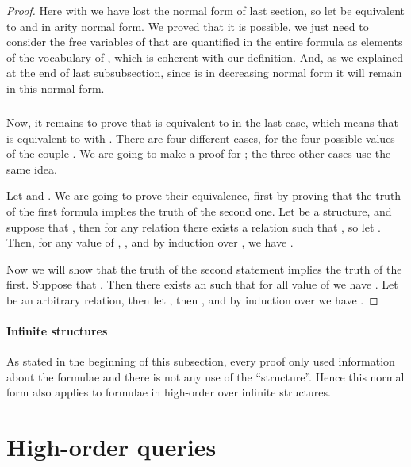 \documentclass[a4paper,12pt]{article}
\theoremstyle{definition}
\begin{document}
\begin{proof}
  Here with  we have lost the normal form of last
  section, so let  be equivalent to  and in arity
  normal form. We proved that it is possible, we just need to consider
  the free variables of  that are quantified in the entire
  formula as elements of the vocabulary of , which is coherent
  with our definition. And, as we explained at the end of last
  subsubsection, since  is in decreasing normal form it will
  remain in this normal form.

  \subparagraph{} Now, it remains to prove that  is equivalent
  to  in the last case, which means that  is equivalent to  with . There are four
  different cases, for the four possible values of the couple
  . We are going to make a proof for ;
  the three other cases use the same idea.

  Let  and
  . We are
  going to prove their equivalence, first by proving that the truth of
  the first formula implies the truth of the second one.  Let 
  be a structure, and suppose that , then for any
  relation  there exists a relation  such that , so
  let . Then, for any value of  , , and by
  induction over , we have .

  Now we will show that the truth of the second statement implies the
  truth of the first. Suppose that . Then there
  exists an  such that for all value of 
  we have . Let  be an arbitrary relation, then let , then , and by induction over
   we have .

\end{proof}

\paragraph{Infinite structures}
As stated in the beginning of this subsection, every proof only used
information about the formulae and there is not any use of the
``structure''. Hence this normal form also applies to formulae in
high-order over infinite structures.
\section{High-order queries}\label{hoq}
\end{document}

